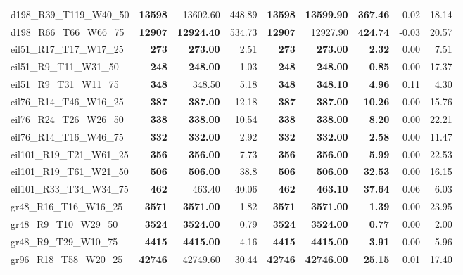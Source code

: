 \documentclass{singlecol-new}
\begin{document}
{\begin{longtable}{lrrrrrrrr}
		d198\_R39\_T119\_W40\_50 & \textbf{13598} & 13602.60 & 448.89 & \textbf{13598} & \textbf{13599.90} & \textbf{367.46} & 0.02 & 18.14 \\
		d198\_R66\_T66\_W66\_75 & \textbf{12907} & \textbf{12924.40} & 534.73 & \textbf{12907} & 12927.90 & \textbf{424.74} & -0.03 & 20.57 \\
		eil51\_R17\_T17\_W17\_25 & \textbf{273} & \textbf{273.00} & 2.51 & \textbf{273} & \textbf{273.00} & \textbf{2.32} & 0.00 & 7.51 \\
		eil51\_R9\_T11\_W31\_50 & \textbf{248} & \textbf{248.00} & 1.03 & \textbf{248} & \textbf{248.00} & \textbf{0.85} & 0.00 & 17.37 \\
		eil51\_R9\_T31\_W11\_75 & \textbf{348} & 348.50 & 5.18 & \textbf{348} & \textbf{348.10} & \textbf{4.96} & 0.11 & 4.30 \\
		eil76\_R14\_T46\_W16\_25 & \textbf{387} & \textbf{387.00} & 12.18 & \textbf{387} & \textbf{387.00} & \textbf{10.26} & 0.00 & 15.76 \\
		eil76\_R24\_T26\_W26\_50 & \textbf{338} & \textbf{338.00} & 10.54 & \textbf{338} & \textbf{338.00} & \textbf{8.20} & 0.00 & 22.21 \\
		eil76\_R14\_T16\_W46\_75 & \textbf{332} & \textbf{332.00} & 2.92 & \textbf{332} & \textbf{332.00} & \textbf{2.58} & 0.00 & 11.47 \\
		eil101\_R19\_T21\_W61\_25 & \textbf{356} & \textbf{356.00} & 7.73 & \textbf{356} & \textbf{356.00} & \textbf{5.99} & 0.00 & 22.53 \\
		eil101\_R19\_T61\_W21\_50 & \textbf{506} & \textbf{506.00} & 38.8 & \textbf{506} & \textbf{506.00} & \textbf{32.53} & 0.00 & 16.15 \\
		eil101\_R33\_T34\_W34\_75 & \textbf{462} & 463.40 & 40.06 & \textbf{462} & \textbf{463.10} & \textbf{37.64} & 0.06 & 6.03 \\
		gr48\_R16\_T16\_W16\_25 & \textbf{3571} & \textbf{3571.00} & 1.82 & \textbf{3571} & \textbf{3571.00} & \textbf{1.39} & 0.00 & 23.95 \\
		gr48\_R9\_T10\_W29\_50 & \textbf{3524} & \textbf{3524.00} & 0.79 & \textbf{3524} & \textbf{3524.00} & \textbf{0.77} & 0.00 & 2.00 \\
		gr48\_R9\_T29\_W10\_75 & \textbf{4415} & \textbf{4415.00} & 4.16 & \textbf{4415} & \textbf{4415.00} & \textbf{3.91} & 0.00 & 5.96 \\
		gr96\_R18\_T58\_W20\_25 & \textbf{42746} & 42749.60 & 30.44 & \textbf{42746} & \textbf{42746.00} & \textbf{25.15} & 0.01 & 17.40 \\

\end{longtable}}
\end{document}
